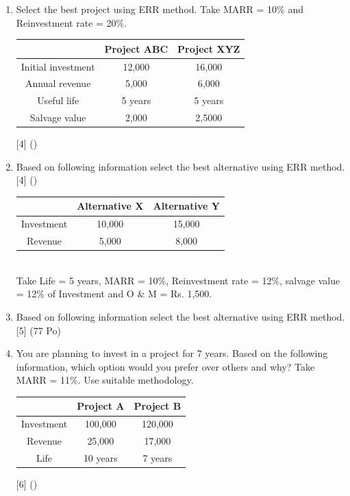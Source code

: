 \documentclass[12pt]{article}
\begin{document}
\begin{enumerate}[noitemsep, topsep=0pt]
		\item Select the best project using ERR method. Take MARR = 10\% and Reinvestment rate = 20\%.\\
		\begin{tabular}{|c|c|c|}
			\hline
			& Project ABC & Project XYZ \\ \hline
			Initial investment & 12,000 & 16,000 \\ \hline
			Annual revenue & 5,000 & 6,000 \\ \hline
			Useful life & 5 years & 5 years \\ \hline
			Salvage value & 2,000 & 2,5000 \\ \hline		
		\end{tabular}  \hfill [4] ()
		
		\item Based on following information select the best alternative using ERR method. \hfill [4] ()\\
		\begin{tabular}{|c|c|c|}
			\hline
			& Alternative X & Alternative Y \\ \hline
			Investment & 10,000 & 15,000 \\ \hline
			Revenue & 5,000 & 8,000 \\ \hline
		\end{tabular}\\
		Take Life = 5 years, MARR = 10\%, Reinvestment rate = 12\%, salvage value = 12\% of Investment and O \& M = Rs. 1,500.

		\item Based on following information select the best alternative using ERR method. \hfill [5] (77 Po)
		
		\item You are planning to invest in a project for 7 years. Based on the following information, which option would you prefer over others and why? Take MARR = 11\%. Use suitable methodology. 
		\begin{tabular}{|c|c|c|}
			\hline
			& Project A & Project B \\ \hline
			Investment & 100,000 & 120,000 \\ \hline
			Revenue & 25,000 & 17,000 \\ \hline
			Life & 10 years & 7 years \\ \hline
		\end{tabular}\hfill [6] ()
		

\end{enumerate}
\end{document}
